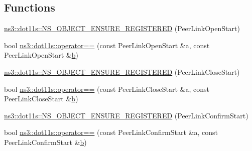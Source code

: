 \subsection*{Functions}
\begin{DoxyCompactItemize}
\item 
\hyperlink{namespacens3_1_1dot11s_a03b06db2978c756962e4aa494b0a94d0}{ns3\+::dot11s\+::\+N\+S\+\_\+\+O\+B\+J\+E\+C\+T\+\_\+\+E\+N\+S\+U\+R\+E\+\_\+\+R\+E\+G\+I\+S\+T\+E\+R\+ED} (Peer\+Link\+Open\+Start)
\item 
bool \hyperlink{namespacens3_1_1dot11s_a1ef39ad02f14bc3415c983b762c6ebd9}{ns3\+::dot11s\+::operator==} (const Peer\+Link\+Open\+Start \&a, const Peer\+Link\+Open\+Start \&\hyperlink{lte__pathloss_8m_a21ad0bd836b90d08f4cf640b4c298e7c}{b})
\item 
\hyperlink{namespacens3_1_1dot11s_ae0009bcacd10364dec76e6e45e69f7a4}{ns3\+::dot11s\+::\+N\+S\+\_\+\+O\+B\+J\+E\+C\+T\+\_\+\+E\+N\+S\+U\+R\+E\+\_\+\+R\+E\+G\+I\+S\+T\+E\+R\+ED} (Peer\+Link\+Close\+Start)
\item 
bool \hyperlink{namespacens3_1_1dot11s_a7f5c687d0aa8e9e2135c5f0790cacb82}{ns3\+::dot11s\+::operator==} (const Peer\+Link\+Close\+Start \&a, const Peer\+Link\+Close\+Start \&\hyperlink{lte__pathloss_8m_a21ad0bd836b90d08f4cf640b4c298e7c}{b})
\item 
\hyperlink{namespacens3_1_1dot11s_a17e08f89dd410fae9e376744881f9aaa}{ns3\+::dot11s\+::\+N\+S\+\_\+\+O\+B\+J\+E\+C\+T\+\_\+\+E\+N\+S\+U\+R\+E\+\_\+\+R\+E\+G\+I\+S\+T\+E\+R\+ED} (Peer\+Link\+Confirm\+Start)
\item 
bool \hyperlink{namespacens3_1_1dot11s_a6f11ad6f9117372b86953b0f4eddffa1}{ns3\+::dot11s\+::operator==} (const Peer\+Link\+Confirm\+Start \&a, const Peer\+Link\+Confirm\+Start \&\hyperlink{lte__pathloss_8m_a21ad0bd836b90d08f4cf640b4c298e7c}{b})
\end{DoxyCompactItemize}
